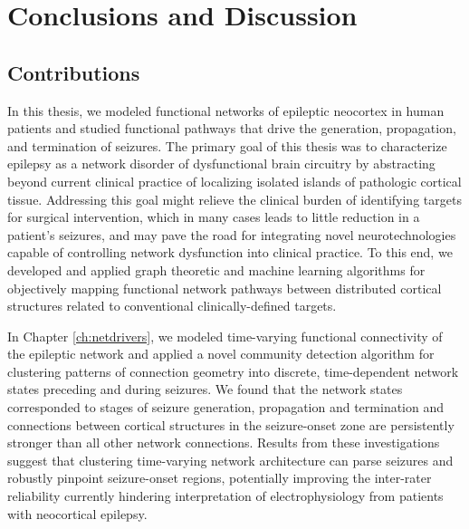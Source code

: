 \chapter{Conclusions and Discussion}
\label{ch:conclusion}

\ifpdf
    \graphicspath{{conclusion/figures/PNG/}{conclusion/figures/PDF/}{conclusion/figures/}}
\else
    \graphicspath{{conclusion/figures/EPS/}{conclusion/figures/}}
\fi


\section{Contributions}
In this thesis, we modeled functional networks of epileptic neocortex in human patients and studied functional pathways that drive the generation, propagation, and termination of seizures. The primary goal of this thesis was to characterize epilepsy as a network disorder of dysfunctional brain circuitry by abstracting beyond current clinical practice of localizing isolated islands of pathologic cortical tissue. Addressing this goal might relieve the clinical burden of identifying targets for surgical intervention, which in many cases leads to little reduction in a patient's seizures, and may pave the road for integrating novel neurotechnologies capable of controlling network dysfunction into clinical practice. To this end, we developed and applied graph theoretic and machine learning algorithms for objectively mapping functional network pathways between distributed cortical structures related to conventional clinically-defined targets. 

In Chapter \ref{ch:netdrivers}, we modeled time-varying functional connectivity of the epileptic network and applied a novel community detection algorithm for clustering patterns of connection geometry into discrete, time-dependent network states preceding and during seizures. We found that the network states corresponded to stages of seizure generation, propagation and termination and connections between cortical structures in the seizure-onset zone are persistently stronger than all other network connections. Results from these investigations suggest that clustering time-varying network architecture can parse seizures and robustly pinpoint seizure-onset regions, potentially improving the inter-rater reliability currently hindering interpretation of electrophysiology from patients with neocortical epilepsy.

